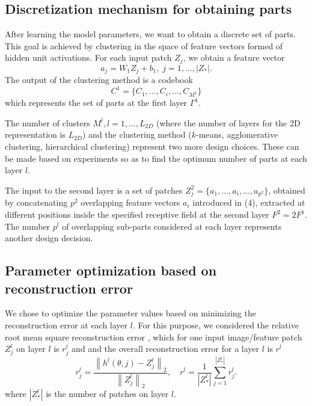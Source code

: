 \documentclass[conference]{IEEEtran}
\begin{document}
\subsection{Discretization mechanism for obtaining parts} 

After learning the model parameters, we want to obtain a discrete set of parts. This goal is achieved by clustering in the space of feature vectors formed of hidden unit activations. For each input patch $Z_j$, we obtain a feature vector
\begin{equation}
a_j=W_1Z_j+b_1, \;j=1,\ldots,|Z_*|.
\end{equation}
The output of the clustering method is a codebook
\begin{equation}
C^1=\{C_1,\ldots,C_i,\ldots,C_{M^1}\}
\end{equation}
which represents the set of parts at the first layer $\Gamma^{1}$. 

The number of clusters $M^l, l=1,\ldots,L_{2D}$ (where the number of layers for the 2D representation is $L_{2D}$) and the clustering method ($k$-means, agglomerative clustering, hierarchical clustering) represent two more design choices. These can be made based on experiments so as to find the optimum number of parts at each layer $l$. 

The input to the second layer is a set of patches $Z_j^2=\{a_1,\ldots,a_i,\ldots,a_{p^2}\}$, obtained by concatenating  $p^2$ overlapping feature vectors $a_i$ introduced in (4), extracted at different positions inside the specified receptive field at the second layer $F^2=2F^1$. The number $p^l$ of overlapping sub-parts considered at each layer represents another design decision.

\subsection{Parameter optimization based on reconstruction error}

We chose to optimize the parameter values based on minimizing the reconstruction error at each layer $l$. For this purpose, we considered the relative root mean square reconstruction error \cite{Chai2014}, which for one input image/feature patch $Z_j^l$ on layer $l$ is $r_j^l$ and and the overall reconstruction error for a layer $l$ is $r^l$
\begin{equation}
  r_j^l = \frac{\left\|h^l(\theta,j)-Z_j^l\right\|_2}{\left\|Z_j^l\right\|_2},\quad
   r^l = \frac{1}{|Z_*^l|} \sum_{j=1}^{|Z_*^l|} r_j^l.
  \label{eqn:recon-error.patch}
\end{equation}
where $|Z_*^l|$ is the number of patches on layer $l$.
\end{document}
